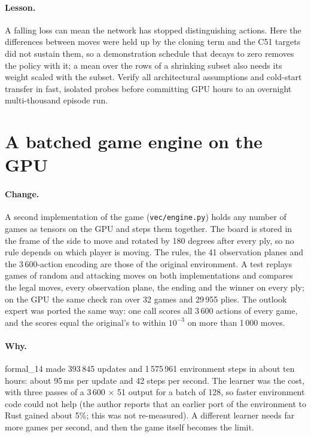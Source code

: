 \paragraph{Lesson.} A falling loss can mean the network has stopped distinguishing actions. Here the
differences between moves were held up by the cloning term and the C51 targets did not sustain them,
so a demonstration schedule that decays to zero removes the policy with it; a mean over the rows of a
shrinking subset also needs its weight scaled with the subset. Verify all architectural assumptions and cold-start transfer in fast, isolated
probes before committing GPU hours to an overnight multi-thousand episode run.

\section{A batched game engine on the GPU}
\label{sec:vec-engine}

\paragraph{Change.} A second implementation of the game (\texttt{vec/engine.py}) holds any number
of games as tensors on the GPU and steps them together. The board is stored in the frame of the
side to move and rotated by 180 degrees after every ply, so no rule depends on which player is
moving. The rules, the 41 observation planes and the 3\,600-action encoding are those of the
original environment. A test replays games of random and attacking moves on both implementations
and compares the legal moves, every observation plane, the ending and the winner on every ply; on
the GPU the same check ran over 32 games and 29\,955 plies. The outlook expert was ported the same
way: one call scores all 3\,600 actions of every game, and the scores equal the original's to
within $10^{-3}$ on more than 1\,000 moves.

\paragraph{Why.} formal\_14 made 393\,845 updates and 1\,575\,961 environment steps in about ten
hours: about 95\,ms per update and 42 steps per second. The learner was the cost, with three passes
of a 3\,600 $\times$ 51 output for a batch of 128, so faster environment code could not help (the
author reports that an earlier port of the environment to Rust gained about 5\%; this was not
re-measured). A different learner needs far more games per second, and then the game itself
becomes the limit.

